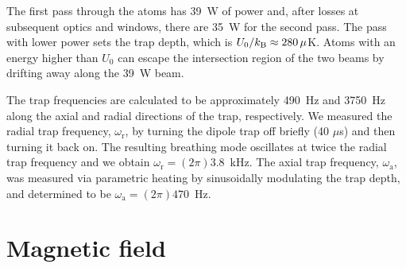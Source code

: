 The first pass through the atoms has 39~W of power and, after losses at
subsequent optics and windows, there are 35~W for the second pass.  The pass
with lower power sets the trap depth,  which is $U_{0}/k_{\mathrm{B}}\approx 280\,\mu$K.  Atoms with an energy higher than $U_{0}$ can escape the intersection
region of the two beams by drifting away along the 39~W beam. 

The trap frequencies are calculated to be approximately 490~Hz and 3750~Hz
along the axial and radial directions of the trap, respectively.  We measured
the radial trap frequency, $\omega_{\mathrm{r}}$, by turning the dipole trap
off briefly (40 $\mu$s) and then turning it back on. The resulting breathing
mode oscillates at twice the radial trap frequency and we obtain
$\omega_{\mathrm{r}} = (2\pi)3.8$~kHz.   The axial trap frequency,
$\omega_{\mathrm{a}}$,  was measured via parametric heating by sinusoidally
modulating the trap depth, and determined to be $\omega_{\mathrm{a}} =
(2\pi)470$~Hz.  



\section{Magnetic field}

